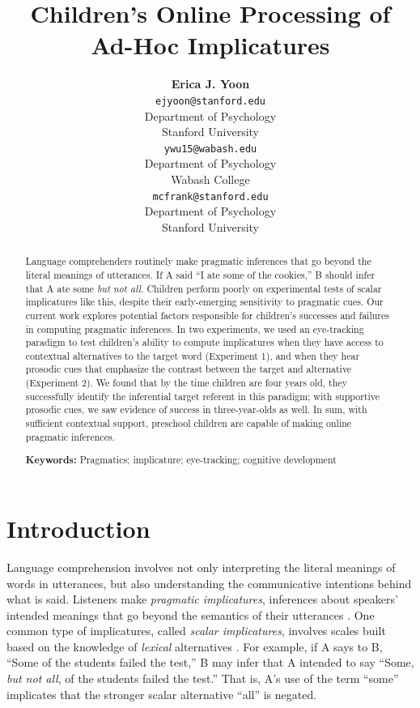 \documentclass[10pt,letterpaper]{article}
\title{Children's Online Processing of Ad-Hoc Implicatures}
\author{{\large \bf Erica J. Yoon} \\
  \texttt{ejyoon@stanford.edu} \\
  Department of Psychology \\
  Stanford University
  \And {\large \bf Yunan Charles Wu} \\
  \texttt{ywu15@wabash.edu} \\
  Department of Psychology \\
  Wabash College
  \And {\large \bf Michael C. Frank} \\
  \texttt{mcfrank@stanford.edu} \\
  Department of Psychology \\
  Stanford University}
\begin{document}
\maketitle

\begin{abstract}
Language comprehenders routinely make pragmatic inferences that go beyond the literal meanings of utterances. If A said ``I ate some of the cookies,'' B should infer that A ate some \emph{but not all}. Children perform poorly on experimental tests of scalar implicatures like this, despite their early-emerging sensitivity to pragmatic cues. Our current work explores potential factors responsible for children's successes and failures in computing pragmatic inferences. In two experiments, we used an eye-tracking paradigm to test children's ability to compute implicatures when they have access to contextual alternatives to the target word (Experiment 1), and when they hear prosodic cues that emphasize the contrast between the target and alternative (Experiment 2). We found that by the time children are four years old, they successfully identify the inferential target referent in this paradigm; with supportive prosodic cues, we saw evidence of success in three-year-olds as well. In sum, with sufficient contextual support, preschool children are capable of making online pragmatic inferences.

\textbf{Keywords:} 
Pragmatics; implicature; eye-tracking; cognitive development

\end{abstract}

\section{Introduction}

Language comprehension involves not only interpreting the literal meanings of words in utterances, but also understanding the communicative intentions behind what is said. Listeners make \emph{pragmatic implicatures}, inferences about speakers' intended meanings that go beyond the semantics of their utterances \cite{grice1975logic}. One common type of implicatures, called  \emph{scalar implicatures}, involves scales built based on the knowledge of \emph{lexical} alternatives \cite{horn1972}. For example, if A says to B, ``Some of the students failed the test,'' B may infer that A intended to say ``Some, \emph{but not all}, of the students failed the test.'' That is, A's use of the term ``some'' implicates that the stronger scalar alternative ``all'' is negated. 
\end{document}
